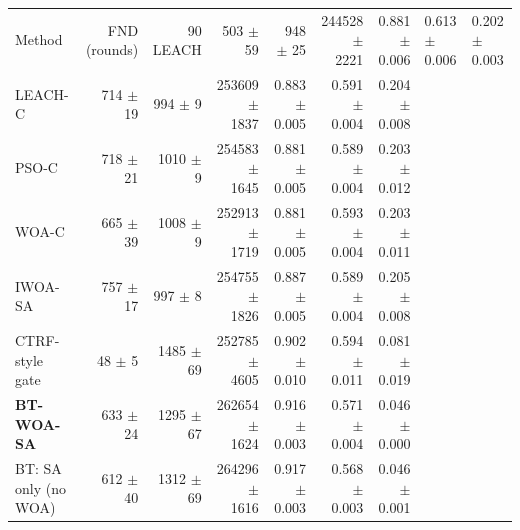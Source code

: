 \begin{tabular}{lrrrrrr}
\toprule
Method & FND (rounds) & 90 %
\midrule
LEACH & 503 $\pm$ 59 & 948 $\pm$ 25 & 244528 $\pm$ 2221 & 0.881 $\pm$ 0.006 & 0.613 $\pm$ 0.006 & 0.202 $\pm$ 0.003 \\
LEACH-C & 714 $\pm$ 19 & 994 $\pm$ 9 & 253609 $\pm$ 1837 & 0.883 $\pm$ 0.005 & 0.591 $\pm$ 0.004 & 0.204 $\pm$ 0.008 \\
PSO-C & 718 $\pm$ 21 & 1010 $\pm$ 9 & 254583 $\pm$ 1645 & 0.881 $\pm$ 0.005 & 0.589 $\pm$ 0.004 & 0.203 $\pm$ 0.012 \\
WOA-C & 665 $\pm$ 39 & 1008 $\pm$ 9 & 252913 $\pm$ 1719 & 0.881 $\pm$ 0.005 & 0.593 $\pm$ 0.004 & 0.203 $\pm$ 0.011 \\
IWOA-SA & 757 $\pm$ 17 & 997 $\pm$ 8 & 254755 $\pm$ 1826 & 0.887 $\pm$ 0.005 & 0.589 $\pm$ 0.004 & 0.205 $\pm$ 0.008 \\
CTRF-style gate & 48 $\pm$ 5 & 1485 $\pm$ 69 & 252785 $\pm$ 4605 & 0.902 $\pm$ 0.010 & 0.594 $\pm$ 0.011 & 0.081 $\pm$ 0.019 \\
\textbf{BT-WOA-SA} & 633 $\pm$ 24 & 1295 $\pm$ 67 & 262654 $\pm$ 1624 & 0.916 $\pm$ 0.003 & 0.571 $\pm$ 0.004 & 0.046 $\pm$ 0.000 \\
BT: SA only (no WOA) & 612 $\pm$ 40 & 1312 $\pm$ 69 & 264296 $\pm$ 1616 & 0.917 $\pm$ 0.003 & 0.568 $\pm$ 0.003 & 0.046 $\pm$ 0.001 \\
\bottomrule
\end{tabular}